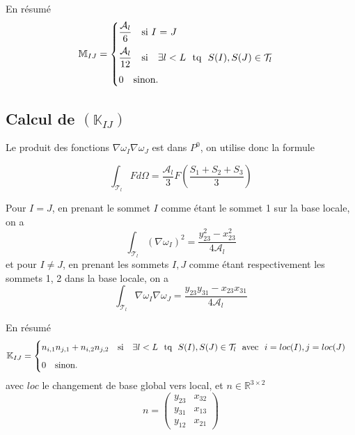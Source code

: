 \documentclass[11pt]{article}
\newcommand{\A}{\mathcal{A}}
\newcommand{\R}{\mathbb{R}}
\newcommand{\K}{\mathbb{K}}
\newcommand{\M}{\mathbb{M}}
\newcommand{\ms}{~~~}
\begin{document}
En résumé
\begin{equation}
  \M_{IJ} =
  \begin{cases}
    \dfrac{\A_l}{6} \ms \mbox{si $I$ = $J$} \medskip\\
    \dfrac{\A_l}{12} \ms \mbox{si} \ms \exists l < L \mbox{~~tq~~} S(I), S(J) \in \mathcal{T}_l \medskip\\
    0 \ms \mbox{sinon}.
  \end{cases}
\end{equation}


\subsection{Calcul de $(\K_{IJ})$}

Le produit des fonctions $\nabla \omega_I \nabla \omega_J$ est dans $P^0$, on utilise donc la formule

\begin{equation}
  \int_{\mathcal{T}_l} F d\Omega = \frac{\A_l}{3}F\left(\frac{S_1+S_2+S_3}{3} \right)  
\end{equation}

Pour $I=J$, en prenant le sommet $I$ comme étant le sommet 1 sur la base locale, on a
\begin{equation}
  \int_{\mathcal{T}_l} (\nabla \omega_I)^2 = \frac{y_{23}^2-x_{23}^2}{4\A_l}
\end{equation}
et pour $I\neq J$, en prenant les sommets $I, J$ comme étant respectivement les sommets 1, 2 dans la base locale, on a
\begin{equation}
  \int_{\mathcal{T}_l} \nabla \omega_I \nabla \omega_J = \frac{y_{23}y_{31}-x_{23}x_{31}}{4\A_l}
\end{equation}

En résumé
\begin{equation}
  \K_{IJ} =
  \begin{cases}
    n_{i,1}n_{j,1} + n_{i,2}n_{j,2} \ms \mbox{si} \ms \exists l < L \mbox{~~tq~~} S(I), S(J) \in \mathcal{T}_l \mbox{~~avec~~} i=loc(I), j=loc(J)\medskip\\
    0 \ms \mbox{sinon}.
  \end{cases}
\end{equation}
avec $loc$ le changement de base global vers local, et $n\in\R^{3\times 2}$
\begin{equation}
  n = \left(
  \begin{matrix}
    y_{23} & x_{32} \\
    y_{31} & x_{13} \\
    y_{12} & x_{21} 
  \end{matrix}
  \right)
\end{equation}
\end{document}
